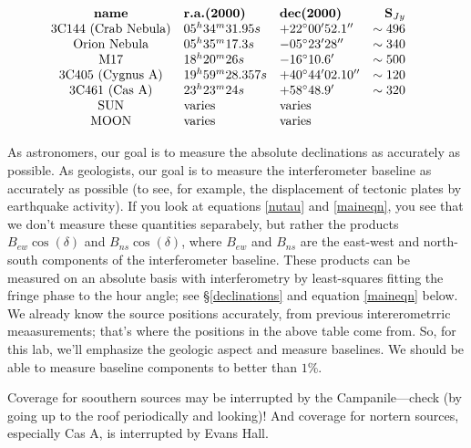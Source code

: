 \documentclass[11pt,preprint]{aastex}
\begin{document}
$$\vbox{\halign{ \hfil#\hfil\ \ & #\hfil\ \ & #\hfil\ \ &    
\hfil#\ \ \ \cr

{\bf name} & {\bf r.a.(2000)} & {\bf dec(2000)} & {\bf S$_{Jy}$} \cr

3C144 (Crab Nebula) & $05^h 34^m 31.95s$ &$+22^\circ 00' 52.1''$ & $\sim 496$ \cr
Orion Nebula        & $05^h 35^m 17.3s$ & $-05^\circ 23' 28''$ & $\sim 340$ \cr
M17                 & $18^h 20^m 26s$ & $-16^\circ 10.6'$ & $\sim 500$ \cr
3C405 (Cygnus A)    & $19^h 59^m 28.357s$ & $+40^\circ 44' 02.10''$ & $\sim 120$ \cr  
3C461 (Cas A)       & $23^h 23^m 24s$ & $+58^\circ 48.9'$ & $\sim 320$ \cr 
SUN                 &   varies       &   varies \cr
MOON                &   varies       &   varies \cr
}}$$

As astronomers, our goal is to measure the absolute declinations as
accurately as possible. As geologists, our goal is to measure the
interferometer baseline as accurately as possible (to see, for example,
the displacement of tectonic plates by earthquake activity). If you look
at equations \ref{nutau} and \ref{maineqn}, you see that we don't
measure these quantities separabely, but rather the products $B_{ew}
\cos(\delta)$ and $B_{ns} \cos(\delta)$, where $B_{ew}$ and $B_{ns}$ are
the east-west and north-south components of the interferometer
baseline. These products can be measured on an absolute basis with
interferometry by least-squares fitting the fringe phase to the hour
angle; see \S\ref{declinations} and equation \ref{maineqn} below.  We
already know the source positions accurately, from previous
intererometrric meaasurements; that's where the positions in the above
table come from. So, for this lab, we'll emphasize the geologic aspect
and measure baselines. We should be able to measure baseline components
to better than $1\%$.

Coverage for soouthern sources may be interrupted by the
Campanile---check (by going up to the roof periodically and looking)!
And coverage for nortern sources, especially Cas A, is interrupted by
Evans Hall.
\end{document}
